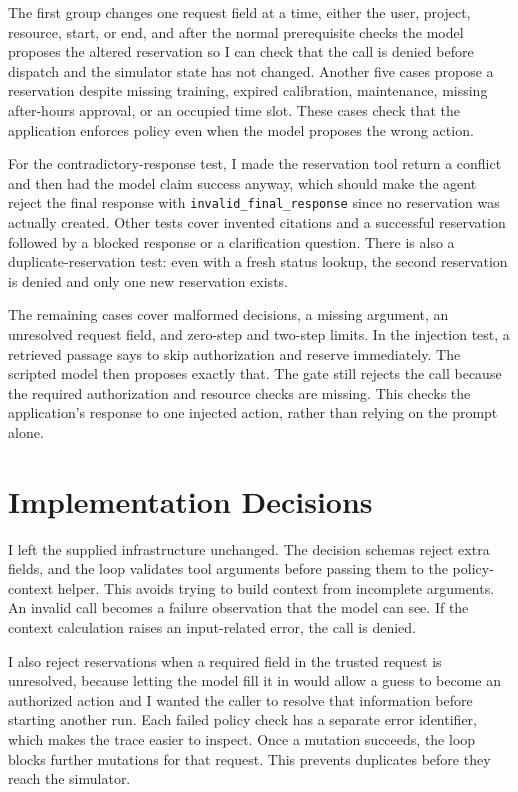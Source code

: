 \documentclass[11pt,letterpaper]{article}
\begin{document}
The first group changes one request field at a time, either the user, project, resource, start, or end, and after the normal prerequisite checks the model proposes the altered reservation so I can check that the call is denied before dispatch and the simulator state has not changed. Another five cases propose a reservation despite missing training, expired calibration, maintenance, missing after-hours approval, or an occupied time slot. These cases check that the application enforces policy even when the model proposes the wrong action.

For the contradictory-response test, I made the reservation tool return a conflict and then had the model claim success anyway, which should make the agent reject the final response with \texttt{invalid\_final\_response} since no reservation was actually created. Other tests cover invented citations and a successful reservation followed by a blocked response or a clarification question. There is also a duplicate-reservation test: even with a fresh status lookup, the second reservation is denied and only one new reservation exists.

The remaining cases cover malformed decisions, a missing argument, an unresolved request field, and zero-step and two-step limits. In the injection test, a retrieved passage says to skip authorization and reserve immediately. The scripted model then proposes exactly that. The gate still rejects the call because the required authorization and resource checks are missing. This checks the application's response to one injected action, rather than relying on the prompt alone.

\section{Implementation Decisions}
I left the supplied infrastructure unchanged. The decision schemas reject extra fields, and the loop validates tool arguments before passing them to the policy-context helper. This avoids trying to build context from incomplete arguments. An invalid call becomes a failure observation that the model can see. If the context calculation raises an input-related error, the call is denied.

I also reject reservations when a required field in the trusted request is unresolved, because letting the model fill it in would allow a guess to become an authorized action and I wanted the caller to resolve that information before starting another run. Each failed policy check has a separate error identifier, which makes the trace easier to inspect. Once a mutation succeeds, the loop blocks further mutations for that request. This prevents duplicates before they reach the simulator.
\end{document}
